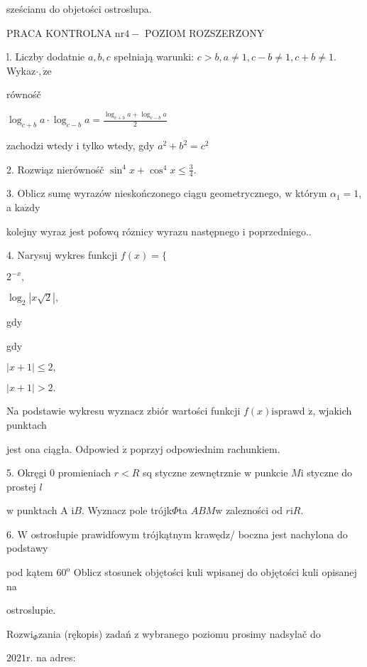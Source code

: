 \documentclass[a4paper,12pt]{article}
\begin{document}
sześcianu do objetości ostroslupa.




PRACA KONTROLNA $\mathrm{n}\mathrm{r} 4-$ POZIOM ROZSZERZONY

l. Liczby dodatnie $a, b, c$ spełniają warunki: $c>b, a\neq 1, c-b\neq 1, c+b\neq 1$. Wykaz$\cdot, \dot{\mathrm{z}}\mathrm{e}$

równośč

$\displaystyle \log_{c+b}a\cdot\log_{c-b}a=\frac{\log_{c+b}a+\log_{c-b}a}{2}$

zachodzi wtedy $\mathrm{i}$ tylko wtedy, gdy $a^{2}+b^{2}=c^{2}$

2. Rozwiąz nierównośč $\displaystyle \sin^{4}x+\cos^{4}x\leq\frac{3}{4}.$

3. Oblicz sumę wyrazów nieskończonego ciągu geometrycznego, $\mathrm{w}$ którym $\alpha_{1}=1$, a $\mathrm{k}\mathrm{a}\dot{\mathrm{z}}\mathrm{d}\mathrm{y}$

kolejny wyraz jest pofowq róznicy wyrazu następnego $\mathrm{i}$ poprzedniego..

4. Narysuj wykres funkcji $f(x)=\{$

$2^{-x},$

$\log_{2}|x\sqrt{2}|,$

gdy

gdy

$|x+1|\leq 2,$

$|x+1|>2.$

Na podstawie wykresu wyznacz zbiór wartości funkcji $f(x)\mathrm{i}\mathrm{s}$prawd $\acute{\mathrm{z}}$, wjakich punktach

jest ona ciągła. Odpowied $\acute{\mathrm{z}}$ poprzyj odpowiednim rachunkiem.

5. Okręgi $0$ promieniach $r<R$ sq styczne zewnętrznie $\mathrm{w}$ punkcie $M\mathrm{i}$ styczne do prostej $l$

$\mathrm{w}$ punktach A $\mathrm{i}B$. Wyznacz pole trójk$\Phi$ta $ABM\mathrm{w}$ zalezności od $r\mathrm{i}R.$

6. $\mathrm{W}$ ostrosłupie prawidfowym trójkątnym krawędz/ boczna jest nachylona do podstawy

pod kątem $60^{\mathrm{o}}$ Oblicz stosunek objętości kuli wpisanej do objętości kuli opisanej na

ostroslupie.

$\mathrm{R}\mathrm{o}\mathrm{z}\mathrm{w}\mathrm{i}_{\Phi}$zania (rękopis) zadań $\mathrm{z}$ wybranego poziomu prosimy nadsylač do

$2021\mathrm{r}$. na adres:
\end{document}
